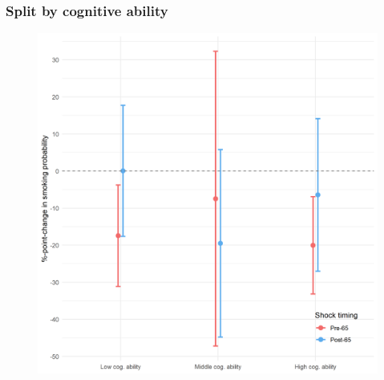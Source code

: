 \documentclass[10pt,compress,xcolor=dvipsnames,aspectratio=169]{beamer}    %
\newcounter{ex}
\newcommand{\1}[1]{\mathrm{1\hspace*{-2.5pt}l}[#1]}	%
\begin{document}
\begin{frame}
\frametitle{Split by cognitive ability}

\begin{figure}[hbtp]
\centering
\includegraphics[height=0.8\textheight]{../../3_output/shock_effects/cog_6070_100_cvplot.png}
\label{fig:cog}
\end{figure}
\hyperlink{frame:otherX}{}
\end{frame}
\end{document}
